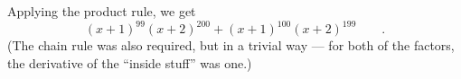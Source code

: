 Applying the product rule, we get
\begin{equation*}
  (x+1)^{99}(x+2)^{200}+  (x+1)^{100}(x+2)^{199} \qquad .
\end{equation*}
(The chain rule was also required, but in a trivial way --- for both of
the factors, the derivative of the ``inside stuff'' was one.)
